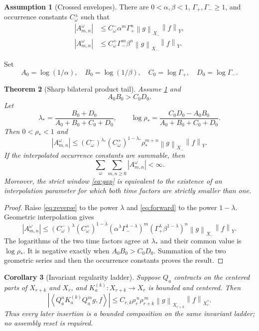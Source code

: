 \documentclass[11pt,reqno]{amsart}
\newtheorem{theorem}{Theorem}[section]
\newtheorem{corollary}[theorem]{Corollary}
\theoremstyle{definition}
\newtheorem{assumption}[theorem]{Assumption}
\theoremstyle{remark}
\newcommand{\norm}[1]{\left\lVert #1\right\rVert}
\newcommand{\abs}[1]{\left\lvert #1\right\rvert}
\newcommand{\pair}[2]{\left\langle #1,#2\right\rangle}
\begin{document}
\begin{assumption}[Crossed envelopes]\label{ass:crossed}
There are $0<\alpha,\beta<1$, $\Gamma_+,\Gamma_-\ge1$, and occurrence
constants $C_\omega^\pm$ such that
\begin{align}
 \abs{A_{m,n}^{\omega}}
 &\le C_\omega^-\alpha^m\Gamma_+^n
 \norm g_{X_-}\norm f_Y,\label{eq:reverse}\\
 \abs{A_{m,n}^{\omega}}
 &\le C_\omega^+\Gamma_-^m\beta^n
 \norm g_{X_-}\norm f_Y.\label{eq:forward}
\end{align}
\end{assumption}

Set
\[
 A_0=\log(1/\alpha),\quad B_0=\log(1/\beta),\quad
 C_0=\log\Gamma_+,\quad D_0=\log\Gamma_-.
\]

\begin{theorem}[Sharp bilateral product tail]\label{thm:bilateral}
Assume \cref{ass:crossed} and
\begin{equation}\label{eq:gap}
 A_0B_0>C_0D_0.
\end{equation}
Let
\[
 \lambda_*=
 \frac{B_0+D_0}{A_0+B_0+C_0+D_0},
 \qquad
 \log\rho_*=
 \frac{C_0D_0-A_0B_0}{A_0+B_0+C_0+D_0}.
\]
Then $0<\rho_*<1$ and
\begin{equation}\label{eq:product}
 \abs{A_{m,n}^{\omega}}
 \le
 (C_\omega^-)^{\lambda_*}(C_\omega^+)^{1-\lambda_*}
 \rho_*^{m+n}\norm g_{X_-}\norm f_Y.
\end{equation}
If the interpolated occurrence constants are summable, then
\[
 \sum_\omega\sum_{m,n\ge0}\abs{A_{m,n}^{\omega}}<\infty.
\]
Moreover, the strict window \eqref{eq:gap} is equivalent to the existence of
an interpolation parameter for which both time factors are strictly smaller
than one.
\end{theorem}

\begin{proof}
Raise \eqref{eq:reverse} to the power $\lambda$ and
\eqref{eq:forward} to the power $1-\lambda$.  Geometric interpolation gives
\[
 \abs{A_{m,n}^{\omega}}
 \le (C_\omega^-)^\lambda(C_\omega^+)^{1-\lambda}
 (\alpha^\lambda\Gamma_-^{1-\lambda})^m
 (\Gamma_+^\lambda\beta^{1-\lambda})^n
 \norm g_{X_-}\norm f_Y.
\]
The logarithms of the two time factors agree at $\lambda_*$ and their common
value is $\log\rho_*$.  It is negative exactly when
$A_0B_0>C_0D_0$.  Summation of the two geometric series and then the
occurrence constants proves the result.
\end{proof}

\begin{corollary}[Invariant regularity ladder]\label{cor:ladder}
Suppose $Q_a$ contracts on the centered parts of $X_{r+k}$ and $X_r$, and
$K_a^{(k)}:X_{r+k}\to X_r$ is bounded and centered.  Then
\[
 \abs{\pair{Q_a^nK_a^{(k)}Q_a^m g}{f}}
 \le C_{r,k}\rho_{r}^{\,n}\rho_{r+k}^{\,m}
 \norm g_{X_{r+k}}\norm f_{X_r^*}.
\]
Thus every later insertion is a bounded composition on the same invariant
ladder; no assembly reset is required.
\end{corollary}
\end{document}
